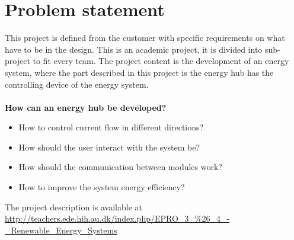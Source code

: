 \chapter{Problem statement}
This project is defined from the customer with specific requirements on what have to be in the design. This is an academic project, it is divided into sub-project to fit every team. The project content is the development of an energy system, where the part described in this project is the energy hub has the controlling device of the energy system.\\
\\
\textbf{How can an energy hub be developed?}
\begin{itemize}
\item How to control current flow in different directions?\\
\item How should the user interact with the system be?\\
\item How should the communication between modules work?\\
\item How to improve the system energy efficiency?\\
\end{itemize}
The project description is available at \url{http://teachers.ede.hih.au.dk/index.php/EPRO_3_%26_4_-_Renewable_Energy_Systems}

